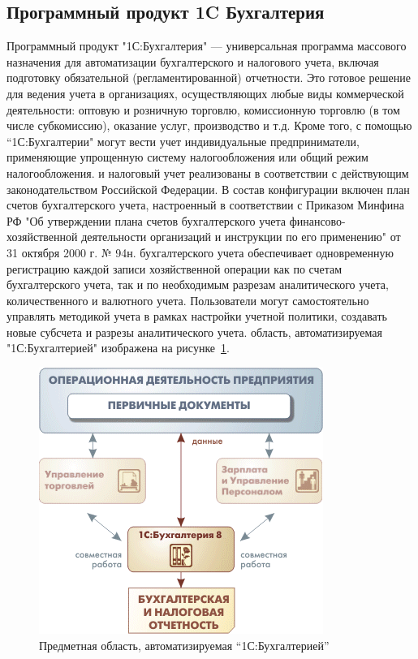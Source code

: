 \documentclass[14pt,a4paper]{reportmod}
\begin{document}
\subsection{Программный продукт 1C Бухгалтерия}
Программный продукт "1С:Бухгалтерия" — универсальная программа массового назначения для автоматизации бухгалтерского и налогового учета, включая подготовку обязательной (регламентированной) отчетности. Это готовое решение для ведения учета в организациях, осуществляющих любые виды коммерческой деятельности: оптовую и розничную торговлю, комиссионную торговлю (в том числе субкомиссию), оказание услуг, производство и т.д. Кроме того, с помощью ``1С:Бухгалтерии" могут вести учет индивидуальные предприниматели, применяющие упрощенную систему налогообложения или общий режим налогообложения.
 и налоговый учет реализованы в соответствии с действующим законодательством Российской Федерации. В состав конфигурации включен план счетов бухгалтерского учета, настроенный в соответствии с Приказом Минфина РФ "Об утверждении плана счетов бухгалтерского учета финансово-хозяйственной деятельности организаций и инструкции по его применению" от 31 октября 2000 г. № 94н.
 бухгалтерского учета обеспечивает одновременную регистрацию каждой записи хозяйственной операции как по счетам бухгалтерского учета, так и по необходимым разрезам аналитического учета, количественного и валютного учета. Пользователи могут самостоятельно управлять методикой учета в рамках настройки учетной политики, создавать новые субсчета и разрезы аналитического учета.
 область, автоматизируемая "1С:Бухгалтерией" изображена на рисунке~\ref{pic:1c_image1}.
\begin{figure}
  \centering
  \includegraphics{pics/1c_image1}
  \caption{Предметная область, автоматизируемая ``1С:Бухгалтерией''}
  \label{pic:1c_image1}
\end{figure}
\end{document}
